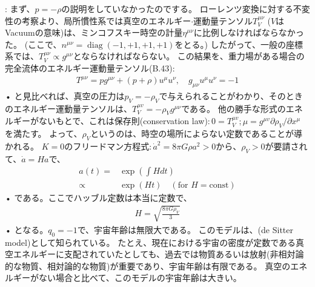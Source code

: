 \documentclass[11pt,a4paper,dvipdfmx]{jsarticle}
\theoremstyle{plain}
\theoremstyle{break}
\def\diag{\mathop{\mathrm{diag}}\nolimits}%
\begin{document}
\noindent
{}:
まず、$p = - \rho$の説明をしていなかったのでする。
ローレンツ変換に対する不変性の考察より、局所慣性系では真空のエネルギー$\cdot$運動量テンソル$T_{V}^{\mu \nu}$ ($V$はVacuumの意味)は、ミンコフスキー時空の計量$\eta^{\mu \nu}$に比例しなければならなかった。
(ここで、$n^{\mu \nu} = \diag (-1,+1,+1,+1)$をとる。)
したがって、一般の座標系では、$T_{V}^{\mu \nu} \propto g^{\mu \nu}$とならなければならない。
この結果を、重力場がある場合の完全流体のエネルギー運動量テンソル(B.43):
\begin{align}
  T^{\mu \nu}=p g^{\mu \nu}+(p+\rho) u^{\mu} u^{\nu}, \quad g_{\mu \nu} u^{\mu} u^{\nu}=-1
\end{align}•%
と見比べれば、真空の圧力は$p_{V} = - \rho_{V}$で与えられることがわかり、そのときのエネルギー運動量テンソルは、$T_{V}^{\mu v}=-\rho_{V} g^{\mu \nu}$である。
他の勝手な形式のエネルギーがないもとで、これは保存則(conservation law)$:0=T_{V}^{\mu v} ; \mu=g^{\mu v} \partial \rho_{V} / \partial x^{\mu}$ を満たす。
よって、$\rho_{V}$というのは、時空の場所によらない定数であることが導かれる。
$K=0$のフリードマン方程式$: \dot{a}^2 = 8\pi G \rho a^2 > 0$から、$\rho_V > 0$が要請されて、$\dot{a} = H a$で、
\begin{align}
  a(t) 
    =&  \exp( \int H dt) \\
    \propto & \exp( H t) \quad (\text{for $H=\mathrm{const}$})
\end{align}•%
である。ここでハッブル定数は本当に定数で、
\begin{align}
  H=\sqrt{\frac{8 \pi G \rho_{V}}{3}}
\end{align}•%
となる。$q_0 = -1$で、宇宙年齢は無限大である。
このモデルは、(de Sitter model)として知られている。
たとえ、現在における宇宙の密度が定数である真空エネルギーに支配されていたとしても、過去では物質あるいは放射(非相対論的な物質、相対論的な物質)が重要であり、宇宙年齢は有限である。
真空のエネルギーがない場合と比べて、このモデルの宇宙年齢は大きい。
\end{document}
